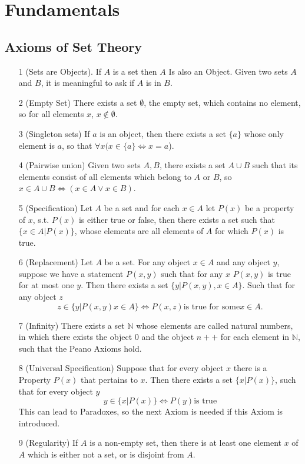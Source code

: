 \documentclass[]{scrbook}
\begin{document}
\section{Fundamentals}
\subsection{Axioms of Set Theory}
\begin{itemize}
	\item[1] (Sets are Objects). If $A$ is a set then $A$ Is also an Object. Given two sets $A$ and $B$, it is meaningful to ask if $A$ is in $B$.
	\item[2] (Empty Set) There exists a set $\emptyset$, the empty set, which contains no element, so for all elements $x$, $x\notin\emptyset$.
	\item[3] (Singleton sets) If $a$ is an object, then there exists a set $\{a\}$ whose only element is $a$, so that $\forall x(x \in \{a\} \Leftrightarrow x = a$).
	\item[4] (Pairwise union) Given two sets $A, B$, there exists a set $A\cup B$ such that its elements consist of all elements which belong to $A$ or $B$, so $x \in A\cup B \Leftrightarrow (x\in A\vee x\in B)$.
	\item[5] (Specification) Let $A$ be a set and for each $x\in A$ let $P(x)$ be a property of $x$, s.t. $P(x)$ is either true or false, then there exists a set such that $\{x\in A | P(x)\}$, whose elements are all elements of $A$ for which $P(x)$ is true.
	\item[6] (Replacement) Let $A$ be a set. For any object $x\in A$ and any object $y$, suppose we have a statement $P(x,y)$ such that for any $x$ $P(x,y)$ is true for at most one $y$. Then there exists a set $\{y| P(x,y) , x\in A\}$. Such that for any object $z$
	\begin{equation*}
		z\in\{y | P(x,y) x\in A\} \Leftrightarrow P(x,z) \text{is true for some} x\in A.
	\end{equation*}
	\item[7] (Infinity) There exists a set $\mathbb{N}$ whose elements are called natural numbers, in which there exists the object $0$ and the object $n++$ for each element in $\mathbb{N}$, such that the Peano Axioms hold.
	\item[8] (Universal Specification) Suppose that for every object $x$ there is a Property $P(x)$ that pertains to $x$. Then there exists a set $\{x | P(x)\}$, such that for every object $y$
		\begin{equation}
			y\in\{x | P(x)\} \Leftrightarrow P(y) \text{is true}
		\end{equation}
	This can lead to Paradoxes, so the next Axiom is needed if this Axiom is introduced.
	\item[9] (Regularity) If $A$ is a non-empty set, then there is at least one element $x$ of $A$ which is either not a set, or is disjoint from $A$.
\end{itemize}
\end{document}
